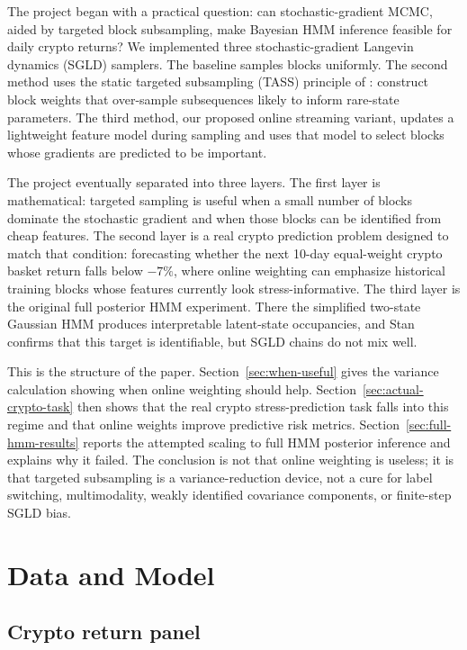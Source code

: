 \documentclass{article}
\newcommand{\1}{\mathbf{1}}
\begin{document}
The project began with a practical question: can stochastic-gradient MCMC, aided by targeted block subsampling, make Bayesian HMM inference feasible for daily crypto returns? We implemented three stochastic-gradient Langevin dynamics (SGLD) samplers. The baseline samples blocks uniformly. The second method uses the static targeted subsampling (TASS) principle of \citet{ou2024tass}: construct block weights that over-sample subsequences likely to inform rare-state parameters. The third method, our proposed online streaming variant, updates a lightweight feature model during sampling and uses that model to select blocks whose gradients are predicted to be important.

The project eventually separated into three layers. The first layer is mathematical: targeted sampling is useful when a small number of blocks dominate the stochastic gradient and when those blocks can be identified from cheap features. The second layer is a real crypto prediction problem designed to match that condition: forecasting whether the next 10-day equal-weight crypto basket return falls below $-7\%$, where online weighting can emphasize historical training blocks whose features currently look stress-informative. The third layer is the original full posterior HMM experiment. There the simplified two-state Gaussian HMM produces interpretable latent-state occupancies, and Stan confirms that this target is identifiable, but SGLD chains do not mix well.

This is the structure of the paper. Section~\ref{sec:when-useful} gives the variance calculation showing when online weighting should help. Section~\ref{sec:actual-crypto-task} then shows that the real crypto stress-prediction task falls into this regime and that online weights improve predictive risk metrics. Section~\ref{sec:full-hmm-results} reports the attempted scaling to full HMM posterior inference and explains why it failed. The conclusion is not that online weighting is useless; it is that targeted subsampling is a variance-reduction device, not a cure for label switching, multimodality, weakly identified covariance components, or finite-step SGLD bias.

\section{Data and Model}

\subsection{Crypto return panel}
\end{document}
